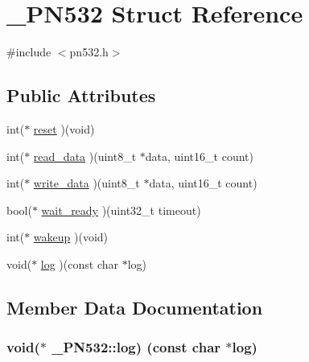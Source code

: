 \hypertarget{struct___p_n532}{}\section{\+\_\+\+P\+N532 Struct Reference}
\label{struct___p_n532}


{\ttfamily \#include $<$pn532.\+h$>$}

\subsection*{Public Attributes}
\begin{DoxyCompactItemize}
\item 
int($\ast$ \hyperlink{struct___p_n532_a2f4dc7d481f5d772469a6f8ab76e2329}{reset} )(void)
\item 
int($\ast$ \hyperlink{struct___p_n532_afc7ae4525260c8a72672783991e0adab}{read\+\_\+data} )(uint8\+\_\+t $\ast$data, uint16\+\_\+t count)
\item 
int($\ast$ \hyperlink{struct___p_n532_ae8b43a07bdf0ac204645a94e553ed810}{write\+\_\+data} )(uint8\+\_\+t $\ast$data, uint16\+\_\+t count)
\item 
bool($\ast$ \hyperlink{struct___p_n532_a5ad6a00a367abc72a4ff25d61e0457a9}{wait\+\_\+ready} )(uint32\+\_\+t timeout)
\item 
int($\ast$ \hyperlink{struct___p_n532_a8995878138fba93d7893bb0144b77b56}{wakeup} )(void)
\item 
void($\ast$ \hyperlink{struct___p_n532_ab6b248b11e5df60b09adcfce1952b64e}{log} )(const char $\ast$log)
\end{DoxyCompactItemize}


\subsection{Member Data Documentation}
\hypertarget{struct___p_n532_ab6b248b11e5df60b09adcfce1952b64e}{}
\subsubsection[{log}]{\setlength{\rightskip}{0pt plus 5cm}void($\ast$ \+\_\+\+P\+N532\+::log) (const char $\ast$log)}\label{struct___p_n532_ab6b248b11e5df60b09adcfce1952b64e}
\hypertarget{struct___p_n532_afc7ae4525260c8a72672783991e0adab}{}
